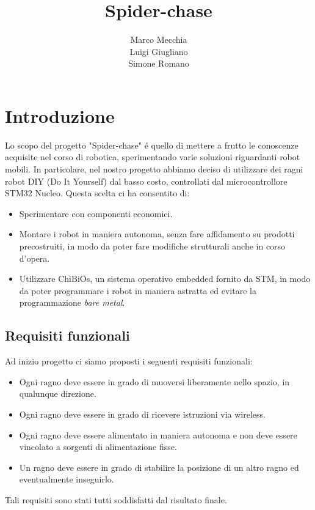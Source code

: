 \documentclass [11pt ,a4paper]{report}
\title{\textbf{Spider-chase}}
\author{Marco Mecchia\\
		Luigi Giugliano\\
		Simone Romano}
\date{}
\begin{document}
\maketitle

\tableofcontents

\cleardoublepage

\chapter{Introduzione}

Lo scopo del progetto "Spider-chase" \'e quello di mettere a frutto le conoscenze acquisite nel corso di robotica, sperimentando varie soluzioni riguardanti robot mobili. In particolare, nel nostro progetto abbiamo deciso di utilizzare dei ragni robot DIY (Do It Yourself) dal basso costo, controllati dal microcontrollore STM32 Nucleo. Questa scelta ci ha consentito di:

\begin{itemize}
\item Sperimentare con componenti economici.
\item Montare i robot in maniera autonoma, senza fare affidamento su prodotti precostruiti, in modo da poter fare modifiche strutturali anche in corso d'opera.
\item Utilizzare ChiBiOs, un sistema operativo embedded fornito da STM, in modo da poter programmare i robot in maniera astratta ed evitare la programmazione \textit{bare metal}.
\end{itemize}

\section{Requisiti funzionali}
Ad inizio progetto ci siamo proposti i seguenti requisiti funzionali:
\begin{itemize}
\item Ogni ragno deve essere in grado di muoversi liberamente nello spazio, in qualunque direzione.
\item Ogni ragno deve essere in grado di ricevere istruzioni via wireless.
\item Ogni ragno deve essere alimentato in maniera autonoma e non deve essere vincolato a sorgenti di alimentazione fisse.
\item Un ragno deve essere in grado di stabilire la posizione di un altro ragno ed eventualmente inseguirlo.
\end{itemize}

Tali requisiti sono stati tutti soddisfatti dal risultato finale.
\end{document}
